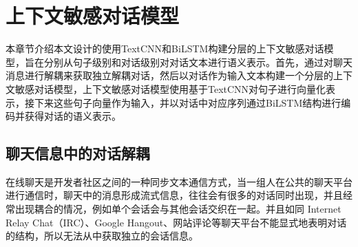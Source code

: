 \chapter{上下文敏感对话模型}
本章节介绍本文设计的使用TextCNN和BiLSTM构建分层的上下文敏感对话模型{\dm}，旨在分别从句子级别和对话级别对对话文本进行语义表示。首先，通过对聊天消息进行解耦来获取独立解耦对话，然后以对话作为输入文本构建一个分层的上下文敏感对话模型，上下文敏感对话模型{\dm}使用基于TextCNN\cite{kim2014convolutional}对句子进行向量化表示，接下来这些句子向量作为输入，并以对话中对应序列通过BiLSTM\cite{graves2013speech}结构进行编码并获得对话的语义表示。


\section{聊天信息中的对话解耦}
在线聊天是开发者社区之间的一种同步文本通信方式，当一组人在公共的聊天平台进行通信时，聊天中的消息形成流式信息，往往会有很多的对话同时出现，并且经常出现耦合的情况，例如单个会话会与其他会话交织在一起。并且如同 Internet Relay Chat（IRC）、Google Hangout、网站评论等聊天平台不能显式地表明对话的结构，所以无法从中获取独立的会话信息。

